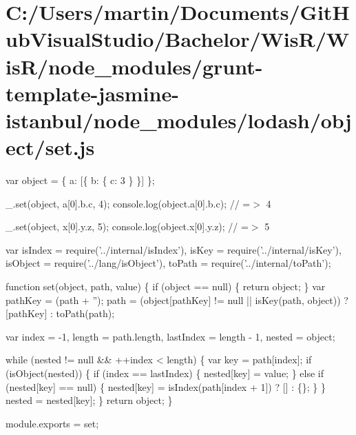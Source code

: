 \hypertarget{_c_1_2_users_2martin_2_documents_2_git_hub_visual_studio_2_bachelor_2_wis_r_2_wis_r_2node_module21569a525cd2685e4964a4da5e697c17}{}\section{C\+:/\+Users/martin/\+Documents/\+Git\+Hub\+Visual\+Studio/\+Bachelor/\+Wis\+R/\+Wis\+R/node\+\_\+modules/grunt-\/template-\/jasmine-\/istanbul/node\+\_\+modules/lodash/object/set.\+js}
var object = \{ \textquotesingle{}a\textquotesingle{}\+: \mbox{[}\{ \textquotesingle{}b\textquotesingle{}\+: \{ \textquotesingle{}c\textquotesingle{}\+: 3 \} \}\mbox{]} \};

\+\_\+.\+set(object, \textquotesingle{}a\mbox{[}0\mbox{]}.b.\+c\textquotesingle{}, 4); console.\+log(object.\+a\mbox{[}0\mbox{]}.b.\+c); // =$>$ 4

\+\_\+.\+set(object, \textquotesingle{}x\mbox{[}0\mbox{]}.y.\+z\textquotesingle{}, 5); console.\+log(object.\+x\mbox{[}0\mbox{]}.y.\+z); // =$>$ 5


\begin{DoxyCodeInclude}
var isIndex = require(\textcolor{stringliteral}{'../internal/isIndex'}),
    isKey = require(\textcolor{stringliteral}{'../internal/isKey'}),
    isObject = require(\textcolor{stringliteral}{'../lang/isObject'}),
    toPath = require(\textcolor{stringliteral}{'../internal/toPath'});

\textcolor{keyword}{function} set(\textcolor{keywordtype}{object}, path, value) \{
  \textcolor{keywordflow}{if} (\textcolor{keywordtype}{object} == null) \{
    \textcolor{keywordflow}{return} object;
  \}
  var pathKey = (path + \textcolor{stringliteral}{''});
  path = (\textcolor{keywordtype}{object}[pathKey] != null || isKey(path, \textcolor{keywordtype}{object})) ? [pathKey] : toPath(path);

  var index = -1,
      length = path.length,
      lastIndex = length - 1,
      nested = object;

  \textcolor{keywordflow}{while} (nested != null && ++index < length) \{
    var key = path[index];
    \textcolor{keywordflow}{if} (isObject(nested)) \{
      \textcolor{keywordflow}{if} (index == lastIndex) \{
        nested[key] = value;
      \} \textcolor{keywordflow}{else} \textcolor{keywordflow}{if} (nested[key] == null) \{
        nested[key] = isIndex(path[index + 1]) ? [] : \{\};
      \}
    \}
    nested = nested[key];
  \}
  \textcolor{keywordflow}{return} object;
\}

module.exports = set;
\end{DoxyCodeInclude}
 